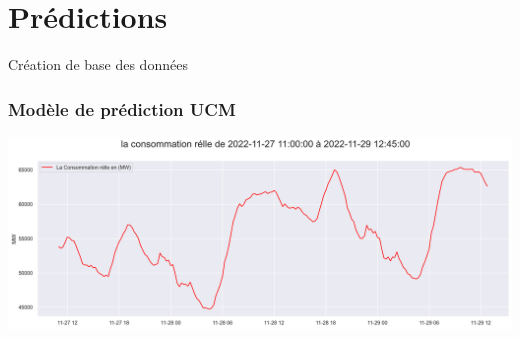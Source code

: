 
\section{Prédictions}

\begin{frame}{Création de base des données }
\begin{center}
\begin{overprint}
\hspace{-0.17em}


\end{overprint}
\end{center}
\end{frame}


\begin{frame}
\frametitle{Modèle de prédiction UCM}
\includegraphics[scale=0.30]{images/outputR.png}

\end{frame}



